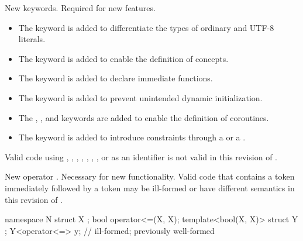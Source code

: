 \change
New keywords.
\rationale
Required for new features.
\begin{itemize}
\item
{}%
The  keyword is added to differentiate
the types of ordinary and UTF-8 literals.
\item
The  keyword is
added to enable the definition of concepts.
\item
The  keyword is added to
declare immediate functions.
\item
The  keyword is added to
prevent unintended dynamic initialization.
\item
The , , and  keywords are added
to enable the definition of coroutines.
\item
The  keyword is added
to introduce constraints through a 
or a .
\end{itemize}
\effectafteritemize
Valid \CppXVII{} code using
,
,
,
,
, , ,
or 
as an identifier is not valid in this revision of \Cpp{}.

\change
New operator \tcode{<=>}.
\rationale
Necessary for new functionality.
\effect
Valid \CppXVII{} code that contains a \tcode{<=} token
immediately followed by a \tcode{>} token
may be ill-formed or have different semantics in this revision of \Cpp{}.
\begin{example}
\begin{codeblock}
namespace N {
  struct X {};
  bool operator<=(X, X);
  template<bool(X, X)> struct Y {};
  Y<operator<=> y;              // ill-formed; previously well-formed
}
\end{codeblock}
\end{example}

